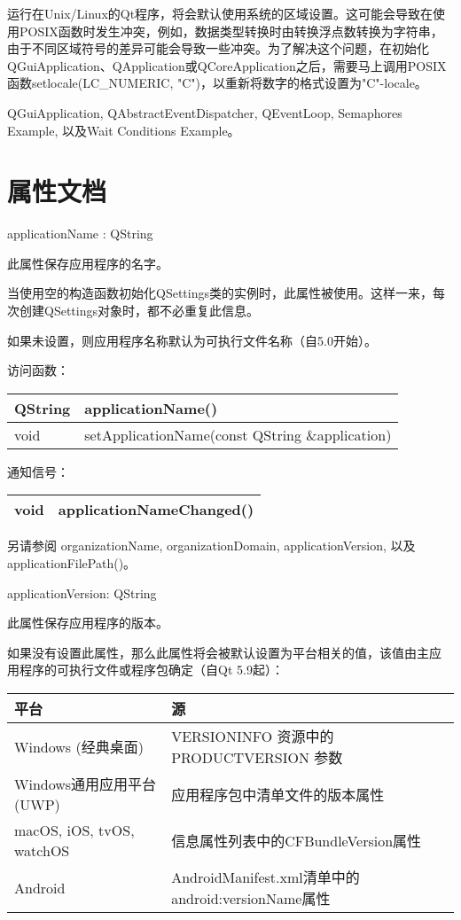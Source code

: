 运行在Unix/Linux的Qt程序，将会默认使用系统的区域设置。这可能会导致在使用POSIX函数时发生冲突，例如，数据类型转换时由转换浮点数转换为字符串，由于不同区域符号的差异可能会导致一些冲突。为了解决这个问题，在初始化QGuiApplication、QApplication或QCoreApplication之后，需要马上调用POSIX函数setlocale(LC\_NUMERIC, "C")，以重新将数字的格式设置为"C"-locale。

\begin{notice}[另请参阅]
QGuiApplication, QAbstractEventDispatcher, QEventLoop, Semaphores Example, 以及Wait Conditions Example。
\end{notice}



\splitLine

\section{属性文档}

applicationName : QString

此属性保存应用程序的名字。

当使用空的构造函数初始化QSettings类的实例时，此属性被使用。这样一来，每次创建QSettings对象时，都不必重复此信息。

如果未设置，则应用程序名称默认为可执行文件名称（自5.0开始）。

访问函数：

\begin{tabular}{|l|l|}
\hline
QString	&applicationName()\\
\hline
void	&setApplicationName(const QString \&application)\\
\hline
\end{tabular}

通知信号：

\begin{tabular}{|l|l|}
\hline
void	&applicationNameChanged()\\
\hline
\end{tabular}

另请参阅 organizationName, organizationDomain, applicationVersion, 以及 applicationFilePath()。

applicationVersion: QString

此属性保存应用程序的版本。

如果没有设置此属性，那么此属性将会被默认设置为平台相关的值，该值由主应
用程序的可执行文件或程序包确定（自Qt 5.9起）：

\begin{tabular}{|l|l|}
\hline
平台	&源\\
\hline
Windows (经典桌面)&	VERSIONINFO 资源中的 PRODUCTVERSION 参数\\
\hline
Windows通用应用平台(UWP)&	应用程序包中清单文件的版本属性\\
\hline
macOS, iOS, tvOS, watchOS&	信息属性列表中的CFBundleVersion属性\\
\hline
Android	&AndroidManifest.xml清单中的android:versionName属性\\
\hline
\end{tabular}

